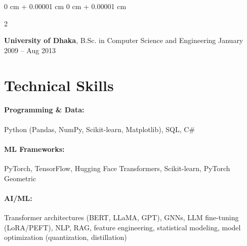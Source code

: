 \documentclass[10pt, letterpaper]{article}
\newenvironment{onecolentry}{
    \begin{adjustwidth}{
        0 cm + 0.00001 cm
    }{
        0 cm + 0.00001 cm
    }
}{
    \end{adjustwidth}
} %
\newenvironment{twocolentry}[2][]{
    \onecolentry
    \def\secondColumn{#2}
    \setcolumnwidth{\fill, 4.5 cm}
    \begin{paracol}{2}
}{
    \switchcolumn \raggedleft \secondColumn
    \end{paracol}
    \endonecolentry
} %
\begin{document}
        \begin{twocolentry}{
            January 2009 – Aug 2013
        }
            \textbf{University of Dhaka}, B.Sc. in Computer Science and Engineering\end{twocolentry}
    
        




\vspace{-1mm}
\section{Technical Skills}

        \paragraph{Programming \& Data:} Python (Pandas, NumPy, Scikit-learn, Matplotlib), SQL, C\#
        \vspace{-4mm}
        \paragraph{ML Frameworks:} PyTorch, TensorFlow, Hugging Face Transformers, Scikit-learn, PyTorch Geometric
        \vspace{-4mm}
        \paragraph{AI/ML:} Transformer architectures (BERT, LLaMA, GPT), GNNs, LLM fine-tuning (LoRA/PEFT), NLP, RAG, feature engineering, statistical modeling, model optimization (quantization, distillation)
        \vspace{-4mm}
\end{document}
